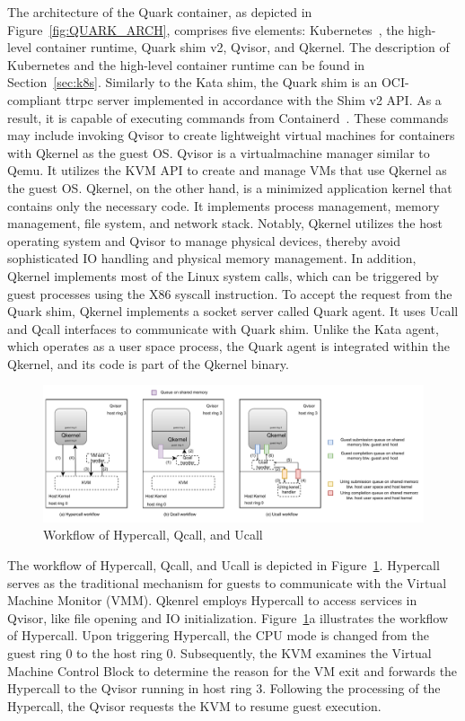 The architecture of the Quark container, as depicted in Figure~\ref{fig:QUARK_ARCH}, comprises five elements: Kubernetes~\cite*{k8s}, the high-level container runtime, Quark shim v2, Qvisor, and Qkernel. The description of Kubernetes and the high-level container runtime can be found in Section~\ref{sec:k8s}. 
Similarly to the Kata shim, the Quark shim is an OCI-compliant ttrpc server implemented in accordance with the Shim v2 API. As a result, it is capable of executing commands from Containerd~\cite*{containerd}. These commands may include invoking Qvisor to create lightweight virtual machines for 
containers with Qkernel as the guest OS. Qvisor is a virtualmachine manager similar to Qemu. It utilizes the KVM API to create and manage VMs that use Qkernel as the guest OS. Qkernel, on the other hand, is a minimized application kernel that contains only the necessary code. It implements process 
management, memory management, file system, and network stack. Notably, Qkernel utilizes the host operating system and Qvisor to manage physical devices, thereby avoid sophisticated IO handling and physical memory management. In addition, Qkernel implements most of the Linux system calls, which can be triggered by 
guest processes using the X86 syscall instruction. To accept the request from the Quark shim,  Qkernel implements a socket server called Quark agent. It uses Ucall 
and Qcall interfaces to communicate with Quark shim. Unlike the Kata agent, which operates as a user space process, the Quark agent is integrated within the Qkernel, and its code is part of the Qkernel binary.



\begin{figure}[htp]
  \centering
  \includegraphics[width=1\textwidth]{images/hypercall_qcall_ucall.pdf}
  \caption[Workflow of Hypercall, Qcall, and Ucall]{Workflow of Hypercall, Qcall, and Ucall}
  \label{fig:hypercall_qcall_ucall}
\end{figure}


The workflow of Hypercall, Qcall, and Ucall is depicted in Figure~\ref{fig:hypercall_qcall_ucall}. Hypercall serves as the traditional mechanism for guests to communicate with the Virtual Machine Monitor (VMM). Qkenrel employs Hypercall to access services in Qvisor, like file opening and IO 
initialization. Figure~\ref{fig:hypercall_qcall_ucall}a illustrates the workflow of Hypercall. Upon triggering Hypercall, the CPU mode is changed from the guest ring 0  to the host ring 0. Subsequently, the KVM examines the Virtual Machine Control Block to determine the reason for the VM exit and 
forwards the Hypercall to the Qvisor running in host ring 3. Following the processing of the Hypercall, the Qvisor requests the KVM to resume guest execution.

